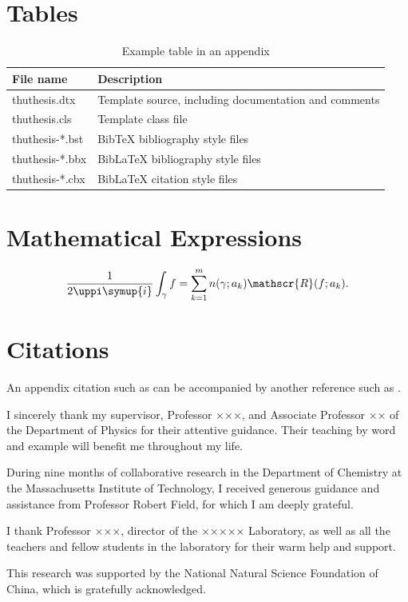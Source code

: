 \documentclass{thuthesis}
\begin{document}
\section{Tables}
\begin{table}
  \centering
  \caption{Example table in an appendix}
  \begin{tabular}{ll}
    \toprule
    File name & Description \\
    \midrule
    thuthesis.dtx   & Template source, including documentation and comments \\
    thuthesis.cls   & Template class file \\
    thuthesis-*.bst & BibTeX bibliography style files \\
    thuthesis-*.bbx & BibLaTeX bibliography style files \\
    thuthesis-*.cbx & BibLaTeX citation style files \\
    \bottomrule
  \end{tabular}
\end{table}

\section{Mathematical Expressions}
\begin{equation}
  \frac{1}{2\uppi\symup{i}}\int_\gamma f
  =\sum_{k=1}^m n(\gamma;a_k)\mathscr{R}(f;a_k).
\end{equation}

\section{Citations}
An appendix citation such as \cite{dupont1974bone} can be accompanied by another
reference such as \cite{zhengkaiqing1987}.

\backmatter

\begin{acknowledgements}
  I sincerely thank my supervisor, Professor ×××, and Associate Professor ×× of
  the Department of Physics for their attentive guidance. Their teaching by word
  and example will benefit me throughout my life.

  During nine months of collaborative research in the Department of Chemistry at
  the Massachusetts Institute of Technology, I received generous guidance and
  assistance from Professor Robert Field, for which I am deeply grateful.

  I thank Professor ×××, director of the ××××× Laboratory, as well as all the
  teachers and fellow students in the laboratory for their warm help
  and support.

  This research was supported by the National Natural Science Foundation of
  China, which is gratefully acknowledged.
\end{acknowledgements}
\end{document}
